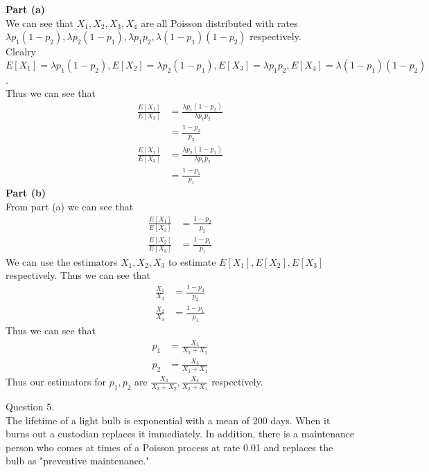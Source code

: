 \documentclass[answers,12pt,addpoints]{exam}
\begin{document}
\begin{questions}
\begin{solution}
    \textbf{Part (a)}\\
    We can see that \(X_1, X_2, X_3, X_4\) are all Poisson distributed with rates \(\lambda p_1(1-p_2), \lambda p_2(1-p_1), \lambda p_1p_2, \lambda (1-p_1)(1-p_2)\) respectively.\\
    Clealry \(E[X_1] = \lambda p_1(1-p_2), E[X_2] = \lambda p_2(1-p_1), E[X_3] = \lambda p_1p_2, E[X_4] = \lambda (1-p_1)(1-p_2)\).\\
    Thus we can see that
    \begin{align*}
        \frac{E[X_1]}{E[X_3]} &= \frac{\lambda p_1(1-p_2)}{\lambda p_1p_2}\\
        &= \frac{1-p_2}{p_2}\\
        \frac{E[X_2]}{E[X_3]} &= \frac{\lambda p_2(1-p_1)}{\lambda p_1p_2}\\
        &= \frac{1-p_1}{p_1}
    \end{align*}
    \textbf{Part (b)}\\
    From part (a) we can see that
    \begin{align*}
        \frac{E[X_1]}{E[X_3]} &= \frac{1-p_2}{p_2}\\
        \frac{E[X_2]}{E[X_3]} &= \frac{1-p_1}{p_1}
    \end{align*}
    We can use the estimators \(X_1, X_2, X_3\) to estimate \(E[X_1], E[X_2], E[X_3]\) respectively. Thus we can see that
    \begin{align*}
        \frac{X_1}{X_3} &= \frac{1-p_2}{p_2}\\
        \frac{X_2}{X_3} &= \frac{1-p_1}{p_1}
    \end{align*}
    Thus we can see that
    \begin{align*}
        p_1 &= \frac{X_3}{X_3 + X_2}\\
        p_2 &= \frac{X_3}{X_3 + X_1}
    \end{align*}
    Thus our estimators for \(p_1, p_2\) are \(\frac{X_3}{X_3 + X_2}, \frac{X_3}{X_3 + X_1}\) respectively.
\end{solution}

\question Question 5.\\
The lifetime of a light bulb is exponential with a mean of 200 days. When it burns out a custodian
replaces it immediately. In addition, there is a maintenance person who comes at times of a Poisson
process at rate 0.01 and replaces the bulb as "preventive maintenance."
\begin{parts}

\end{parts}
\end{questions}
\end{document}
